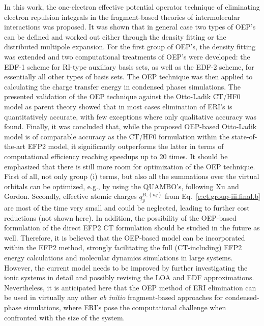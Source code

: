 \documentclass[aip,jcp,amsmath,amssymb,reprint,floatfix]{revtex4-1}
\begin{document}
In this work, the one\hyp{}electron effective potential operator technique
of eliminating electron repulsion integrals in the fragment\hyp{}based
theories of intermolecular interactions
was proposed.
It was shown that in general case two types of OEP's
can be defined and worked out either through the density fitting or the distributed
multipole expansion. For the first group of OEP's, the density fitting was extended
and two computational treatments of OEP's were developed: the EDF-1 scheme
for RI\hyp{}type auxiliary basis sets, as well as the EDF-2 scheme, for
essentially all other types of basis sets. 
The OEP technique was then applied to calculating the charge transfer energy
in condensed phases simulations. 
The presented validation of the OEP technique
against the Otto\hyp{}Ladik CT/HF0 model as parent theory showed that in most cases
elimination of ERI's is quantitatively accurate, with few exceptions
where only qualitative accuracy was found. 
Finally, it was concluded that, while the proposed OEP\hyp{}based Otto\hyp{}Ladik
model is of comparable accuracy as the CT/HF0 formulation within the
state\hyp{}of\hyp{}the\hyp{}art EFP2 model, it significantly outperforms the latter
in terms of computational efficiency reaching speedups up to 20 times.
It should be emphasized that there is still more room for optimization of the
OEP technique. First of all, not only group (i) terms, but also
all the summations over the virtual orbitals can be optimized,
e.g., by using the QUAMBO's, following Xu and Gordon.\cite{Xu.Gordon.JCP.2013}
Secondly, effective atomic charges $q_y^{B,(nj)}$ from Eq.~\eqref{e:ct.group-iii.final.b}
are most of the time very small
and could be neglected, leading to further cost reductions (not shown here).
In addition, the possibility of the OEP\hyp{}based formulation of the direct EFP2 CT formulation
should be studied in the future as well.
Therefore, it is believed that the OEP\hyp{}based
model can be incorporated within the EFP2 method, strongly
facilitating
the full (CT\hyp{}including) EFP2 energy calculations and 
molecular dynamics simulations in large systems. However, the current model
needs to be improved by further investigating the ionic
systems in detail and possibly revising the LOA and EDF approximations.
Nevertheless,
it is anticipated here that the OEP method of ERI elimination can be used in 
virtually any other 
\emph{ab initio} fragment\hyp{}based
approaches for condensed\hyp{}phase simulations, where ERI's pose the
computational challenge when confronted with the size of the system.
\end{document}
